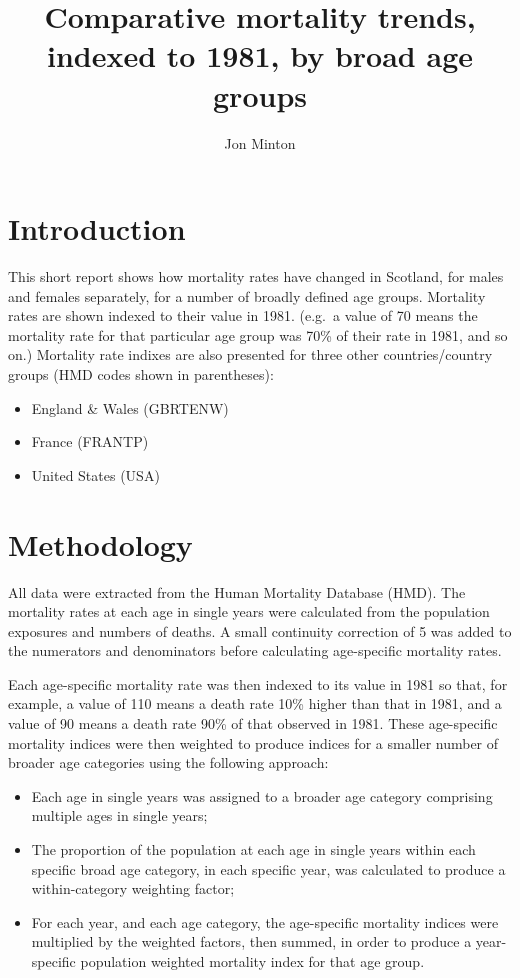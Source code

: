 \documentclass[]{article}
\title{Comparative mortality trends, indexed to 1981, by broad age groups}
\author{Jon Minton}
\date{}
\providecommand{\tightlist}{%
  \setlength{\itemsep}{0pt}\setlength{\parskip}{0pt}}
\begin{document}
\maketitle

\section{Introduction}\label{introduction}

This short report shows how mortality rates have changed in Scotland,
for males and females separately, for a number of broadly defined age
groups. Mortality rates are shown indexed to their value in 1981.
(e.g.~a value of 70 means the mortality rate for that particular age
group was 70\% of their rate in 1981, and so on.) Mortality rate indixes
are also presented for three other countries/country groups (HMD codes
shown in parentheses):

\begin{itemize}
\tightlist
\item
  England \& Wales (GBRTENW)
\item
  France (FRANTP)
\item
  United States (USA)
\end{itemize}

\section{Methodology}\label{methodology}

All data were extracted from the Human Mortality Database (HMD). The
mortality rates at each age in single years were calculated from the
population exposures and numbers of deaths. A small continuity
correction of 5 was added to the numerators and denominators before
calculating age-specific mortality rates.

Each age-specific mortality rate was then indexed to its value in 1981
so that, for example, a value of 110 means a death rate 10\% higher than
that in 1981, and a value of 90 means a death rate 90\% of that observed
in 1981. These age-specific mortality indices were then weighted to
produce indices for a smaller number of broader age categories using the
following approach:

\begin{itemize}
\tightlist
\item
  Each age in single years was assigned to a broader age category
  comprising multiple ages in single years;
\item
  The proportion of the population at each age in single years within
  each specific broad age category, in each specific year, was
  calculated to produce a within-category weighting factor;
\item
  For each year, and each age category, the age-specific mortality
  indices were multiplied by the weighted factors, then summed, in order
  to produce a year-specific population weighted mortality index for
  that age group.
\end{itemize}
\end{document}
